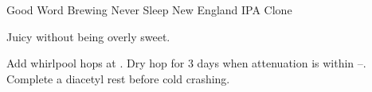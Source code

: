\begin{recipe}{Good Word Brewing Never Sleep New England IPA Clone}

\begin{aboutblock}
Juicy without being overly sweet. \sourceaha
\end{aboutblock}


\begin{methodandtiming}
 
\begin{mashsteps}
\end{mashsteps}

\begin{fermentationsteps}
\end{fermentationsteps}

\begin{directions}
Add whirlpool hops at . Dry hop for 3 days when attenuation is
within --. Complete a diacetyl rest before cold crashing.
\end{directions}

\end{methodandtiming}

\recipebreak

\begin{ingredientsblock}

\begin{malts}
\end{malts}

\begin{hops}
\end{hops}


\end{ingredientsblock}

\end{recipe}

